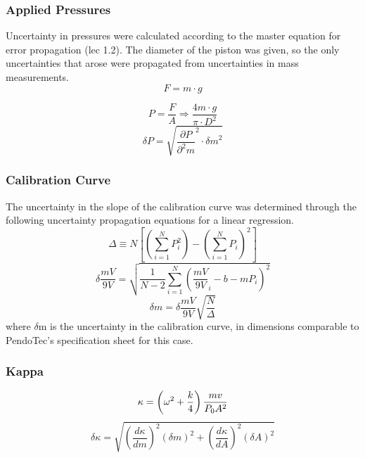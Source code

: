 \documentclass[lettersize,journal]{IEEEtran}
\begin{document}
	\subsubsection{Applied Pressures}
	Uncertainty in pressures were calculated according to the master equation for error propagation (lec 1.2). The diameter of the piston was given, so the only uncertainties that arose were propagated from uncertainties in mass measurements. 
	\begin{equation}
		\label{deqn_ex6}
		F = m \cdot g
	\end{equation}
	
	\begin{equation}
		\label{deqn_ex7}
		P = \frac{F}{A} \Rightarrow \frac{4m \cdot g}{\pi \cdot D^2}
	\end{equation}
	\begin{equation}
		\label{deqn_ex8}
		\delta P = \sqrt{{\frac{\partial P}{{\partial}^2 m}}^2 \cdot {\delta m}^2}  
	\end{equation}
	\subsubsection{Calibration Curve}
	The uncertainty in the slope of the calibration curve was determined through the following uncertainty propagation equations for a linear regression.
	\begin{equation}
		\label{eq:delta-n}
		\Delta \equiv N \left[\left(\sum_{i=1}^N P_i^2\right) - \left(\sum_{i=1}^N P_i\right)^2\right]
	\end{equation}
	\begin{equation}
		\label{eq:delta-y}
		\delta\frac{mV}{9V} = \sqrt{\frac{1}{N-2}\sum_{i=1}^N (\frac{mV}{9V}_i - b - mP_i)^2}
	\end{equation}
	\begin{equation}
		\label{eq:delta-m}
		\delta m = \delta \frac{mV}{9V} \sqrt{\frac{N}{\Delta}}
	\end{equation}
	where $\delta$m is the uncertainty in the calibration curve, in dimensions comparable to PendoTec's specification sheet for this case.
	\subsubsection{Kappa}
	\begin{equation}
		\label{deqn_ex10}
		\kappa = \left(\omega^2 + \frac{k}{4}\right) \frac{m v}{P_0 A^2} \\
	\end{equation}
	\begin{equation}
		\label{deqn_ex10}
		\delta\kappa = \sqrt{\left(\frac{d\kappa}{dm}\right)^2 (\delta m)^2 + \left(\frac{d\kappa}{dA}\right)^2 (\delta A)^2}
	\end{equation}
	
\end{document}
